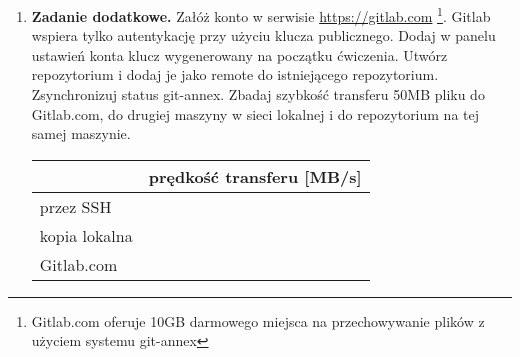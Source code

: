 \documentclass[polish]{article}
\begin{document}
\begin{enumerate}
\begin{lstlisting}
Only 1 of 2 trustworthy copies exist of plik.bin
Back it up with git-annex copy.
failed
(Recording state in git...)
git-annex: fsck: 1 failed

hostB-main.git$ git annex get --auto plik.bin
get plik.bin (from hostA-main...) SHA256-s512000000--4c98cf638799a07eb85872e7f5f5d8d661c09e6e15af02f3655ed9250cae13b0
512000000 100\% 45.54MB/s 0:00:10 (xfer#1, to-check=0/1)

sent 30 bytes received 512062649 bytes 44527189.48 bytes/sec
total size is 512000000 speedup is 1.00
ok
(Recording state in git...)
    \end{lstlisting}
\fi

    \item
    \textbf{Zadanie dodatkowe.} Załóż konto w serwisie
    \href{https://gitlab.com}{https://gitlab.com}
    \footnote{Gitlab.com oferuje 10GB darmowego miejsca na przechowywanie
    plików z użyciem systemu git-annex}.
    Gitlab wspiera tylko autentykację przy użyciu klucza publicznego. Dodaj
    w panelu ustawień konta klucz wygenerowany na początku ćwiczenia.
    Utwórz repozytorium i dodaj je jako remote do istniejącego repozytorium.
    Zsynchronizuj status git-annex. Zbadaj szybkość transferu 50MB pliku do
    Gitlab.com, do drugiej maszyny w sieci lokalnej i do repozytorium na tej
    samej maszynie.

    \begin{tabular}{|l|p{}|}
    \hline
    & prędkość transferu [MB/s] \\
    \hline
    przez SSH & \\
    \hline
    kopia lokalna & \\
    \hline
    Gitlab.com & \\
    \hline
    \end{tabular}

\end{enumerate}
\end{document}
